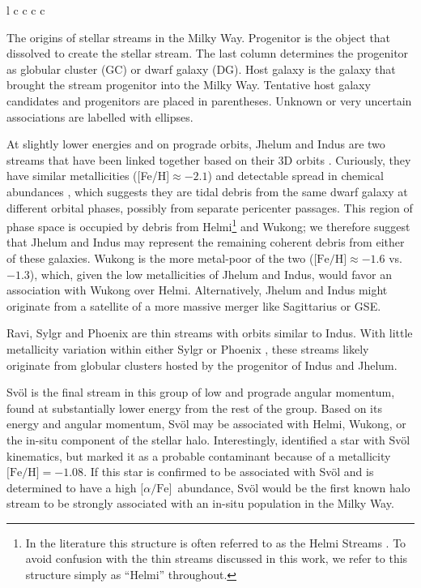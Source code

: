 \documentclass[twocolumn]{aastex63}
\newcommand{\feh}{\ensuremath{\textrm{[Fe/H]}}}
\newcommand{\afe}{\ensuremath{\textrm{[$\alpha$/Fe]}}}
\begin{document}
\begin{deluxetable*}{l c c c c}
\decimals
\startdata

\enddata
\caption{
The origins of stellar streams in the Milky Way.
Progenitor is the object that dissolved to create the stellar stream.
The last column determines the progenitor as globular cluster (GC) or dwarf galaxy (DG).
Host galaxy is the galaxy that brought the stream progenitor into the Milky Way.
Tentative host galaxy candidates and progenitors are placed in parentheses.  Unknown or very uncertain associations are labelled with ellipses.
}
\label{table}
\end{deluxetable*}

At slightly lower energies and on prograde orbits, Jhelum and Indus are two streams that have been linked together based on their 3D orbits \citep{bonaca2019b}.
Curiously, they have similar metallicities ([Fe/H]$\approx-2.1$) and detectable spread in chemical abundances \citep{ji2020}, which suggests they are tidal debris from the same dwarf galaxy at different orbital phases, possibly from separate pericenter passages.
This region of phase space is occupied by debris from Helmi\footnote{In the literature this structure is often referred to as the Helmi Streams \citep{helmi1999}. To avoid confusion with the thin streams discussed in this work, we refer to this structure simply as ``Helmi'' throughout.} and Wukong; we therefore suggest that Jhelum and Indus may represent the remaining coherent debris from either of these galaxies.
Wukong is the more metal-poor of the two ($\feh\approx-1.6$ vs. $-1.3$), which, given the low metallicities of Jhelum and Indus, would favor an association with Wukong over Helmi.
Alternatively, Jhelum and Indus might originate from a satellite of a more massive merger like Sagittarius or GSE.

Ravi, Sylgr and Phoenix are thin streams with orbits similar to Indus.
With little metallicity variation within either Sylgr or Phoenix \citep{ibata2019, wan2020}, these streams likely originate from globular clusters hosted by the progenitor of Indus and Jhelum.

Sv\" ol is the final stream in this group of low and prograde angular momentum, found at substantially lower energy from the rest of the group.
Based on its energy and angular momentum, Sv\" ol may be associated with Helmi, Wukong, or the in-situ component of the stellar halo.
Interestingly, \citet{ibata2019} identified a star with Sv\" ol kinematics, but marked it as a probable contaminant because of a metallicity $\feh=-1.08$.
If this star is confirmed to be associated with Sv\" ol and is determined to have a high \afe\ abundance, Sv\" ol would be the first known halo stream to be strongly associated with an in-situ population in the Milky Way. 
\end{document}
